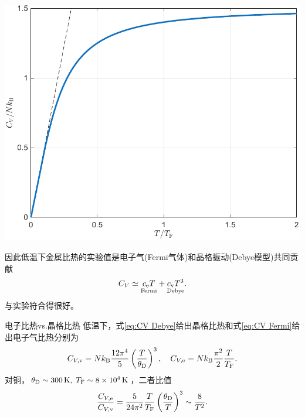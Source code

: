 \begin{center}
	\includegraphics[width=0.8\linewidth]{figures/C_VFermion.pdf}
\end{center}
因此低温下金属比热的实验值是电子气(Fermi气体)和晶格振动(Debye模型)共同贡献
\[
	C_V\simeq\underset{\text{Fermi}}{c_\mathrm e T}+\underset{\text{Debye}}{c_\mathrm v T^3}.
\]
与实验符合得很好。
\begin{example}{电子比热vs.晶格比热}{}
	低温下，式\eqref{eq:CV Debye}给出晶格比热和式\eqref{eq:CV Fermi}给出电子气比热分别为
	\[
	C_{V,\mathrm v}=Nk_{\mathrm B}\frac{12\pi^4}5\left(\frac T{\theta_\mathrm D}\right)^3,\quad C_{V,\mathrm e}=Nk_{\mathrm B}\frac{\pi^2}2\frac T{T_\mathrm F}.
	\]
	对铜，$\theta_\Db\sim\SI{300}\K,\;T_\Fm\sim\SI{8e4}\K$，二者比值
	\[
	\frac{C_{V,\mathrm e}}{C_{V,\mathrm v}}=\frac5{24\pi^2}\frac T{T_\mathrm F}\left(\frac{\theta_\mathrm D}T\right)^3\sim\frac8{T^2}.
	\]
\end{example}